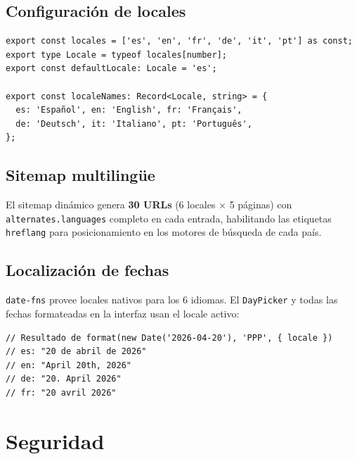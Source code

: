 \documentclass[12pt,a4paper,twoside,openright]{report}
\begin{document}
\section{Configuración de locales}

\begin{lstlisting}[style=tsStyle]
export const locales = ['es', 'en', 'fr', 'de', 'it', 'pt'] as const;
export type Locale = typeof locales[number];
export const defaultLocale: Locale = 'es';

export const localeNames: Record<Locale, string> = {
  es: 'Español', en: 'English', fr: 'Français',
  de: 'Deutsch', it: 'Italiano', pt: 'Português',
};
\end{lstlisting}

\section{Sitemap multilingüe}

El sitemap dinámico genera \textbf{30 URLs} (6 locales × 5 páginas) con
\texttt{alternates.languages} completo en cada entrada, habilitando las etiquetas
\texttt{hreflang} para posicionamiento en los motores de búsqueda de cada país.

\section{Localización de fechas}

\texttt{date-fns} provee locales nativos para los 6 idiomas. El \texttt{DayPicker}
y todas las fechas formateadas en la interfaz usan el locale activo:

\begin{lstlisting}[style=tsStyle]
// Resultado de format(new Date('2026-04-20'), 'PPP', { locale })
// es: "20 de abril de 2026"
// en: "April 20th, 2026"
// de: "20. April 2026"
// fr: "20 avril 2026"
\end{lstlisting}

\chapter{Seguridad}
\end{document}
